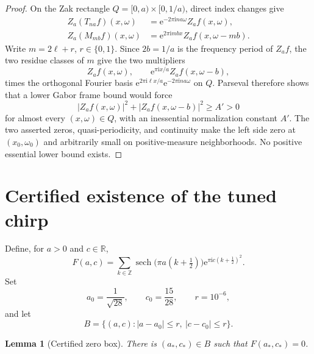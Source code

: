 \documentclass[11pt]{article}
\newtheorem{lemma}[theorem]{Lemma}
\newcommand{\R}{\mathbb R}
\newcommand{\Z}{\mathbb Z}
\newcommand{\sech}{\operatorname{sech}}
\newcommand{\e}{\mathrm e}
\newcommand{\ii}{\mathrm i}
\begin{document}
\begin{proof}
On the Zak rectangle \(Q=[0,a)\times[0,1/a)\), direct index changes give
\begin{align*}
 Z_a(T_{na}f)(x,\omega)&=\e^{-2\pi\ii na\omega}Z_af(x,\omega),\\
 Z_a(M_{mb}f)(x,\omega)&=\e^{2\pi\ii mbx}Z_af(x,\omega-mb).
\end{align*}
Write \(m=2\ell+r\), \(r\in\{0,1\}\).  Since \(2b=1/a\) is the
frequency period of \(Z_af\), the two residue classes of \(m\) give the two
multipliers
\[
 Z_af(x,\omega),\qquad
 \e^{\pi\ii x/a}Z_af(x,\omega-b),
\]
times the orthogonal Fourier basis
\(\e^{2\pi\ii\ell x/a}\e^{-2\pi\ii na\omega}\) on \(Q\).
Parseval therefore shows that a lower Gabor frame bound would force
\[
 |Z_af(x,\omega)|^2+|Z_af(x,\omega-b)|^2\ge A'>0
\]
for almost every \((x,\omega)\in Q\), with an inessential normalization
constant \(A'\).  The two asserted zeros, quasi-periodicity, and continuity
make the left side zero at \((x_0,\omega_0)\) and arbitrarily small on
positive-measure neighborhoods.  No positive essential lower bound exists.
\end{proof}

\section{Certified existence of the tuned chirp}

Define, for \(a>0\) and \(c\in\R\),
\begin{equation}\label{eq:F}
 F(a,c)=\sum_{k\in\Z}
 \sech\!\bigl(\pi a(k+\tfrac12)\bigr)
 \e^{\pi\ii c(k+\frac12)^2}.
\end{equation}
Set
\[
 a_0=\frac1{\sqrt{28}},\qquad c_0=\frac{15}{28},\qquad
 r=10^{-6},
\]
and let
\[
 B=\{(a,c):|a-a_0|\le r,\ |c-c_0|\le r\}.
\]

\begin{lemma}[Certified zero box]\label{lem:zero}
There is \((a_*,c_*)\in B\) such that \(F(a_*,c_*)=0\).
\end{lemma}
\end{document}
